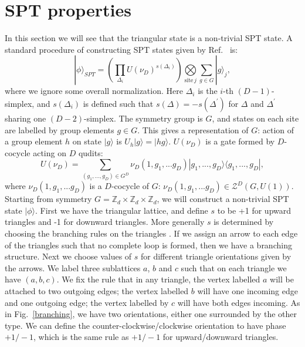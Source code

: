 \documentclass[aps,amsfonts,pra,twocolumn,showpacs]{revtex4-1}
\newcommand{\be}{\begin{equation}}
\newcommand{\ee}{\end{equation}}
\newcommand{\zd}{\mathbb{Z}_d}
\begin{document}
	


\appendix

\section{SPT properties} \label{app:SPT}

In this section we will see that the triangular state is a non-trivial SPT state. A standard procedure of constructing SPT states given by Ref.~\cite{Chen2013, Yoshida2016, Miller2016_2} is: 
	\be
	|\phi\rangle_{SPT} = \left( \prod_{\Delta_i} U(\nu_D)^{s({\Delta_i})} \right) \underset{\mathrm{site} \, j}{\bigotimes}\sum_{g \in G} |g\rangle_j,
	\ee
where we ignore some overall normalization. Here $\Delta_i$ is the $i$-th $(D-1)$-simplex, and $s({\Delta_i})$ is defined such that $s({\Delta})=-s({\Delta^\prime})$ for $\Delta$ and $\Delta^\prime$ sharing one $(D-2)$-simplex. The symmetry group is $G$, and states on each site are labelled by group elements $g \in G$. This gives a representation of $G$: action of a group element $h$ on state $|g\rangle$ is $U_h |g\rangle = |hg\rangle$. $U(\nu_D)$ is a gate formed by $D$-cocycle acting on $D$ qudits:
	\be
	U(\nu_D) = \sum_{(g_1, ... , g_D) \in G^D} \nu_D(1, g_1, ... g_D) |g_1, ... , g_D\rangle \langle g_1, ... , g_D|, 
	\ee
where $\nu_D(1, g_1, ... g_D)$ is a $D$-cocycle of $G$: $\nu_D(1, g_1, ... g_D) \in \mathcal{Z}^D(G, U(1))$. Starting from symmetry $G=\zd \times \zd \times \zd$, we will construct a non-trivial SPT state $|\phi\rangle$. First we have the triangular lattice, and define $s$ to be +1 for upward triangles and -1 for downward triangles. More generally $s$ is determined by choosing the branching rules on the triangles \cite{Chen2013}. If we assign an arrow to each edge of the triangles such that no complete loop is formed, then we have a branching structure. Next we choose values of $s$ for different triangle orientations given by the arrows. We label three sublattices $a$, $b$ and $c$ such that on each triangle we have $(a, b, c)$. We fix the rule that in any triangle, the vertex labelled $a$ will be attached to two outgoing edges; the vertex labelled $b$ will have one incoming edge and one outgoing edge; the vertex labelled by $c$ will have both edges incoming. As in Fig.~\ref{branching}, we have two orientations, either one surrounded by the other type. We can define the counter-clockwise/clockwise orientation to have phase $+1/-1$, which is the same rule as $+1/-1$ for upward/downward triangles.
	
\end{document}
